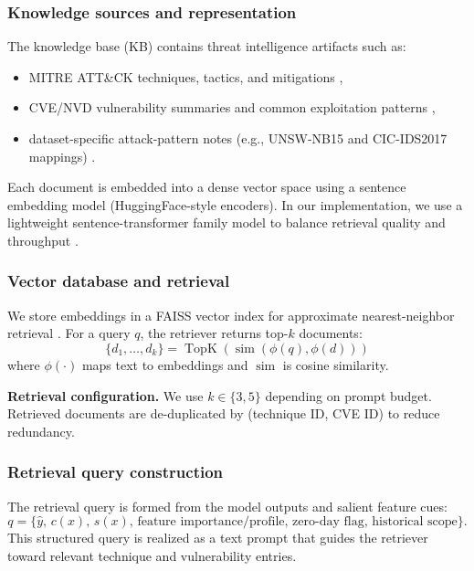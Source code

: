 \subsubsection{Knowledge sources and representation}
The knowledge base (KB) contains threat intelligence artifacts such as:
\begin{itemize}
  \item MITRE ATT\&CK techniques, tactics, and mitigations \cite{MITREATTACK},
  \item CVE/NVD vulnerability summaries and common exploitation patterns \cite{MITRECVE,NISTNVD},
  \item dataset-specific attack-pattern notes (e.g., UNSW-NB15 and CIC-IDS2017 mappings) \cite{Moustafa2015UNSW,Sharafaldin2018CICIDS}.
\end{itemize}
Each document is embedded into a dense vector space using a sentence embedding model (HuggingFace-style encoders). In our implementation, we use a lightweight sentence-transformer family model to balance retrieval quality and throughput \cite{Reimers2019SentenceBERT}.

\subsubsection{Vector database and retrieval}
We store embeddings in a FAISS vector index for approximate nearest-neighbor retrieval \cite{Johnson2019FAISS}. For a query $q$, the retriever returns top-$k$ documents:
\begin{equation}
 \{d_1,\dots,d_k\} = \operatorname{TopK}(\operatorname{sim}(\phi(q),\phi(d)))
\end{equation}
where $\phi(\cdot)$ maps text to embeddings and $\operatorname{sim}$ is cosine similarity.

\textbf{Retrieval configuration.} We use $k\in\{3,5\}$ depending on prompt budget. Retrieved documents are de-duplicated by (technique ID, CVE ID) to reduce redundancy.

\subsubsection{Retrieval query construction}
The retrieval query is formed from the model outputs and salient feature cues:
\begin{equation}
 q = \{\hat{y},\,c(x),\,s(x),\,\text{feature importance/profile},\,\text{zero-day flag},\,\text{historical scope}\}.
\end{equation}
This structured query is realized as a text prompt that guides the retriever toward relevant technique and vulnerability entries.

